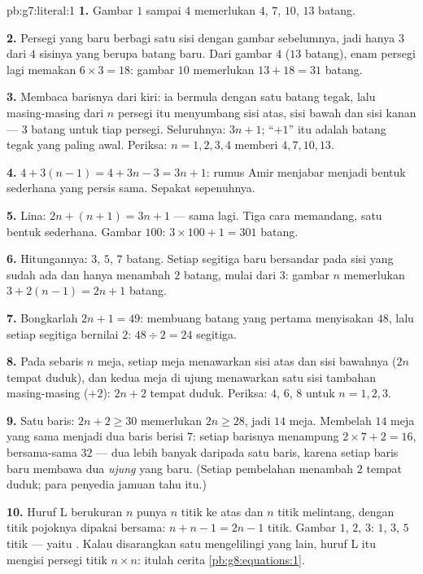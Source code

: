 \begin{solution}{pb:g7:literal:1}
\textbf{1.} Gambar $1$ sampai $4$ memerlukan $4$, $7$, $10$, $13$
batang.

\textbf{2.} Persegi yang baru berbagi satu sisi dengan gambar
sebelumnya, jadi hanya $3$ dari $4$ sisinya yang berupa batang baru.
Dari gambar $4$ ($13$ batang), enam persegi lagi memakan
$6 \times 3 = 18$: gambar $10$ memerlukan $13 + 18 = 31$ batang.

\textbf{3.} Membaca barisnya dari kiri: ia bermula dengan satu batang
tegak, lalu masing-masing dari $n$ persegi itu menyumbang sisi atas,
sisi bawah dan sisi kanan --- $3$ batang untuk tiap persegi.
Seluruhnya: $3n + 1$; ``$+1$'' itu adalah batang tegak yang paling
awal. Periksa: $n = 1, 2, 3, 4$ memberi $4, 7, 10, 13$.

\textbf{4.} $4 + 3(n - 1) = 4 + 3n - 3 = 3n + 1$: rumus Amir
menjabar menjadi bentuk sederhana yang persis sama. Sepakat sepenuhnya.

\textbf{5.} Lina: $2n + (n + 1) = 3n + 1$ --- sama lagi. Tiga cara
memandang, satu bentuk sederhana. Gambar $100$:
$3 \times 100 + 1 = 301$ batang.

\textbf{6.} Hitungannya: $3$, $5$, $7$ batang. Setiap segitiga baru
bersandar pada sisi yang sudah ada dan hanya menambah $2$ batang,
mulai dari $3$: gambar $n$ memerlukan $3 + 2(n - 1) = 2n + 1$ batang.

\textbf{7.} Bongkarlah $2n + 1 = 49$: membuang batang yang pertama
menyisakan $48$, lalu setiap segitiga bernilai $2$:
$48 \div 2 = 24$ segitiga.

\textbf{8.} Pada sebaris $n$ meja, setiap meja menawarkan sisi atas
dan sisi bawahnya ($2n$ tempat duduk), dan kedua meja di ujung
menawarkan satu sisi tambahan masing-masing ($+2$): $2n + 2$ tempat
duduk. Periksa: $4$, $6$, $8$ untuk $n = 1, 2, 3$.

\textbf{9.} Satu baris: $2n + 2 \geq 30$ memerlukan $2n \geq 28$, jadi
$14$ meja. Membelah $14$ meja yang sama menjadi dua baris berisi
$7$: setiap barisnya menampung $2 \times 7 + 2 = 16$, bersama-sama
$32$ --- dua lebih banyak daripada satu baris, karena setiap baris
baru membawa dua \emph{ujung} yang baru. (Setiap pembelahan menambah
$2$ tempat duduk; para penyedia jamuan tahu itu.)

\textbf{10.} Huruf L berukuran $n$ punya $n$ titik ke atas dan $n$
titik melintang, dengan titik pojoknya dipakai bersama:
$n + n - 1 = 2n - 1$ titik. Gambar $1$, $2$, $3$: $1$, $3$, $5$ titik
--- yaitu \emph{}. Kalau disarangkan satu mengelilingi
yang lain, huruf L itu mengisi persegi titik $n \times n$: itulah
cerita \cref{pb:g8:equations:1}.


\end{solution}
